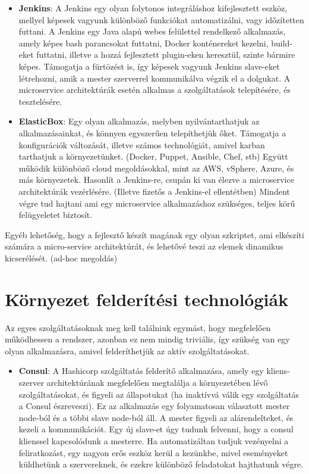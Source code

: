 \documentclass[11pt,magyar,a4paper,oneside,]{report}
\providecommand{\tightlist}{%
  \setlength{\itemsep}{0pt}\setlength{\parskip}{0pt}}
\begin{document}
\begin{itemize}
\item
  \textbf{Jenkins}: A Jenkins egy olyan folytonos integráláshoz
  kifejlesztett eszköz, mellyel képesek vagyunk különböző funkciókat
  automatizálni, vagy időzítetten futtani. A Jenkins egy Java alapú
  webes felülettel rendelkező alkalmazás, amely képes bash parancsokat
  futtatni, Docker konténereket kezelni, build-eket futtatni, illetve a
  hozzá fejlesztett plugin-eken keresztül, szinte bármire képes.
  Támogatja a fürtözést is, így képesek vagyunk Jenkins slave-eket
  létrehozni, amik a mester szerverrel kommunikálva végzik el a
  dolgukat. A microservice architektúrák esetén alkalmas a
  szolgáltatások telepítésére, és tesztelésére.
\item
  \textbf{ElasticBox}: Egy olyan alkalmazás, melyben nyilvántarthatjuk
  az alkalmazásainkat, és könnyen egyszerűen telepíthetjük őket.
  Támogatja a konfigurációk változását, illetve számos technológiát,
  amivel karban tarthatjuk a környezetünket. (Docker, Puppet, Ansible,
  Chef, stb) Együtt működik különböző cloud megoldásokkal, mint az AWS,
  vSphere, Azure, és más környezetek. Hasonlít a Jenkins-re, csupán ki
  van élezve a microservice architektúrák vezérlésére. (Illetve fizetős
  a Jenkins-el ellentétben) Mindent végre tud hajtani ami egy
  microservice alkalmazáshoz szükséges, teljes körű felügyeletet
  biztosít.
\end{itemize}

Egyéb lehetőség, hogy a fejlesztő készít magának egy olyan szkriptet,
ami elkészíti számára a micro-service architektúrát, és lehetővé teszi
az elemek dinamikus kicserélését. (ad-hoc megoldás)

\section{Környezet felderítési
technológiák}\label{kuxf6rnyezet-felderuxedtuxe9si-technoluxf3giuxe1k}

Az egyes szolgáltatásoknak meg kell találniuk egymást, hogy megfelelően
működhessen a rendszer, azonban ez nem mindig triviális, így szükség van
egy olyan alkalmazásra, amivel felderíthetjük az aktív szolgáltatásokat.

\begin{itemize}
\tightlist
\item
  \textbf{Consul}: A Hashicorp szolgáltatás felderítő alkalmazása, amely
  egy kliens-szerver architektúrának megfelelően megtalálja a
  környezetében lévő szolgáltatásokat, és figyeli az állapotukat (ha
  inaktívvá válik egy szolgáltatás a Consul észreveszi). Ez az
  alkalmazás egy folyamatosan választott mester node-ból és a többi
  slave node-ból áll. A mester figyeli az alárendelteket, és kezeli a
  kommunikációt. Egy új slave-et úgy tudunk felvenni, hogy a consul
  klienssel kapcsolódunk a mesterre. Ha automatizáltan tudjuk vezényelni
  a feliratkozást, egy nagyon erős eszköz kerül a kezünkbe, mivel
  eseményeket küldhetünk a szervereknek, és ezekre különböző feladatokat
  hajthatunk végre.
\end{itemize}
\end{document}
